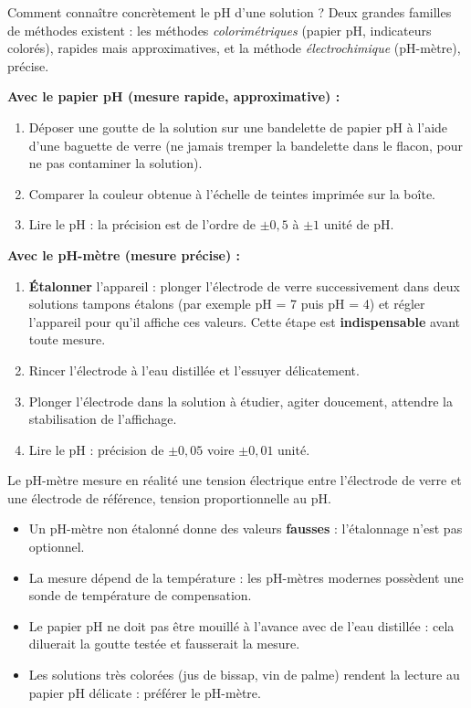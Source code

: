 \documentclass[11pt]{article}
\newcommand{\cle}[1]{{\popxbold\color{popdark}#1}}
\begin{document}
Comment connaître concrètement le pH d'une solution ? Deux grandes familles de méthodes existent : les méthodes \emph{colorimétriques} (papier pH, indicateurs colorés), rapides mais approximatives, et la méthode \emph{électrochimique} (pH-mètre), précise.

\begin{methode}
\textbf{Avec le papier pH (mesure rapide, approximative) :}
\begin{enumerate}
\item Déposer une goutte de la solution sur une bandelette de papier pH à l'aide d'une baguette de verre (ne jamais tremper la bandelette dans le flacon, pour ne pas contaminer la solution).
\item Comparer la couleur obtenue à l'échelle de teintes imprimée sur la boîte.
\item Lire le pH : la précision est de l'ordre de $\pm 0{,}5$ à $\pm 1$ unité de pH.
\end{enumerate}
\textbf{Avec le pH-mètre (mesure précise) :}
\begin{enumerate}
\item \textbf{Étalonner} l'appareil : plonger l'électrode de verre successivement dans deux \cle{solutions tampons} étalons (par exemple pH = 7 puis pH = 4) et régler l'appareil pour qu'il affiche ces valeurs. Cette étape est \textbf{indispensable} avant toute mesure.
\item Rincer l'électrode à l'eau distillée et l'essuyer délicatement.
\item Plonger l'électrode dans la solution à étudier, agiter doucement, attendre la stabilisation de l'affichage.
\item Lire le pH : précision de $\pm 0{,}05$ voire $\pm 0{,}01$ unité.
\end{enumerate}
Le pH-mètre mesure en réalité une tension électrique entre l'électrode de verre et une électrode de référence, tension proportionnelle au pH.
\end{methode}

\begin{attention}
\begin{itemize}
\item Un pH-mètre non étalonné donne des valeurs \textbf{fausses} : l'étalonnage n'est pas optionnel.
\item La mesure dépend de la température : les pH-mètres modernes possèdent une sonde de température de compensation.
\item Le papier pH ne doit pas être mouillé à l'avance avec de l'eau distillée : cela diluerait la goutte testée et fausserait la mesure.
\item Les solutions très colorées (jus de bissap, vin de palme) rendent la lecture au papier pH délicate : préférer le pH-mètre.
\end{itemize}
\end{attention}
\end{document}
